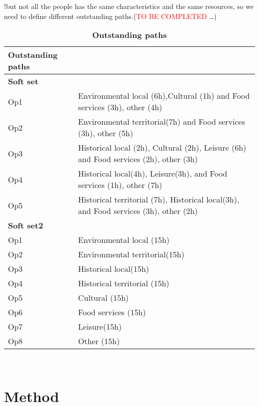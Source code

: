 \documentclass[a4paper]{article}
\begin{document}
!but not all the people has the same characteristics and the same resources, so we need to define different outstanding paths.(\textcolor{red}{TO BE COMPLETED} \dots)



\begin{table}[h]
\centering
\begin{tabular}{ll}
\hline
\textbf{Outstanding paths}\\
\hline
\textbf{Soft set}\\
\parbox{2cm}{Op1}&\parbox{8cm}{Environmental local (6h),Cultural (1h) and Food services (3h), other (4h)}\\
\parbox{2cm}{Op2}&\parbox{8cm}{Environmental territorial(7h) and Food services (3h), other (5h)}\\
\parbox{2cm}{Op3}&\parbox{8cm}{Historical local (2h), Cultural (2h), Leisure (6h) and Food services (2h), other (3h)}\\
\parbox{2cm}{Op4}&\parbox{8cm}{Historical local(4h), Leisure(3h), and Food services (1h), other (7h)}\\
\parbox{2cm}{Op5}&\parbox{8cm}{Historical territorial (7h), Historical local(3h), and Food services (3h), other (2h)}\\
\hline
\textbf{Soft set2}\\
\parbox{2cm}{Op1}&\parbox{8cm}{Environmental local (15h)}\\
\parbox{2cm}{Op2}&\parbox{8cm}{Environmental territorial(15h)}\\
\parbox{2cm}{Op3}&\parbox{8cm}{Historical local(15h)}\\
\parbox{2cm}{Op4}&\parbox{8cm}{Historical territorial (15h)}\\
\parbox{2cm}{Op5}&\parbox{8cm}{Cultural (15h)}\\
\parbox{2cm}{Op6}&\parbox{8cm}{Food services (15h)}\\
\parbox{2cm}{Op7}&\parbox{8cm}{Leisure(15h)}\\
\parbox{2cm}{Op8}&\parbox{8cm}{Other (15h)}\\
\hline
\end{tabular}
\caption{\textbf{Outstanding paths}}\
\label{Table}
\end{table}





\section{Method}
\end{document}
